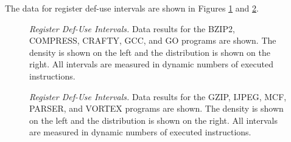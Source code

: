 The data for register def-use intervals are
shown in Figures \ref{fig:aa_ruse} 
and \ref{fig:ab_ruse}.
%
\begin{figure}
\centering
{}
\caption{{\em Register Def-Use Intervals.} 
Data results for the 
BZIP2, COMPRESS, CRAFTY, GCC, and GO programs are shown.
The density is shown on the left and the distribution is shown
on the right.
All intervals are measured in dynamic numbers of executed instructions.}
\label{fig:aa_ruse}
\end{figure}
%
\begin{figure}
\centering
{}
\caption{{\em Register Def-Use Intervals.} 
Data results for the
GZIP, IJPEG, MCF, PARSER, and VORTEX programs are shown.
The density is shown on the left and the distribution is shown
on the right.
All intervals are measured in dynamic numbers of executed instructions.}
\label{fig:ab_ruse}
\end{figure}
%
%
